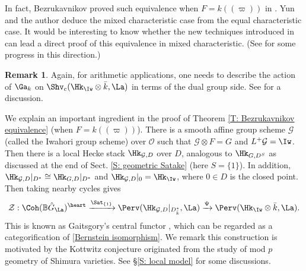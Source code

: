 \documentclass[11pt]{amsart}
\theoremstyle{definition}
\theoremstyle{definition}
\newtheorem{rmk}[thm]{Remark}
\theoremstyle{definition}
\numberwithin{equation}{section}
\newcommand{\bB}{{\mathbb B}}
\newcommand{\mG}{{\mathcal G}}
\newcommand{\mO}{{\mathcal O}}
\newcommand{\mZ}{{\mathcal Z}}
\begin{document}
In fact, Bezrukavnikov proved such equivalence when $F=k(\!(\varpi)\!)$ in \cite{Bezrukavnikov-Affine-Hecke}. Yun and the author deduce the mixed characteristic case from the equal characteristic case. It would be interesting to know whether the new techniques introduced in \cite{Scholze-Berkeley, Fargues-Scholze-Geometrization} can lead a direct proof of this equivalence in mixed characteristic. (See \cite{AGLR} for some progress in this direction.) 

\begin{rmk}
Again, for arithmetic applications, one needs to describe the action of $\Ga_k$ on $\Shv_{c}(\Hk_{\Iw}\otimes\bar k,\La)$ in terms of the dual group side. See \cite{Bezrukavnikov-Affine-Hecke, Hemo-Zhu-Unipotent} for a discussion. 
\end{rmk}

We explain an important ingredient in the proof of Theorem \ref{T: Bezrukavnikov equivalence} (when $F=k(\!(\varpi)\!)$). There is a smooth affine group scheme $\mG$  (called the Iwahori group scheme) over $\mO$ such that $\mG\otimes F=G$ and $L^+\mG=\Iw$. Then  there is a local Hecke stack $\Hk_{\mG,D}$ over $D$, analogous to $\Hk_{G,D^S}$ as discussed at the end of Sect. \ref{S: geometric Satake} (here $S=\{1\}$). In addition,  $\Hk_{\mG,D}|_{D^*}\cong \Hk_{G,D}|_{D^*}$ and $\Hk_{\mG,D}|_0=\Hk_{\Iw}$, where $0\in D$ is the closed point.
Then taking nearby cycles gives
\begin{equation}\label{E: central sheaf}
\mZ: \Coh(\bB\hat{G}_\La)^\heart\xrightarrow{\Sat_{\{1\}}} \Perv(\Hk_{\mG,D}|_{D^*_{\bar k}},\La)\xrightarrow{\Psi} \Perv(\Hk_{\Iw}\otimes \bar k,\La).
\end{equation} 
This is known as Gaitsgory's central functor \cite{Gaitsgory-Central-Sheaf, Zhu-Coherence-Conjecture}, which can be regarded as a  categorification of \eqref{Bernstein isomorphism}.
We remark this construction is motivated by the Kottwitz conjecture originated from the study of mod $p$ geometry of Shimura varieties. See \S \ref{S: local model} for some discussions. 
\end{document}
